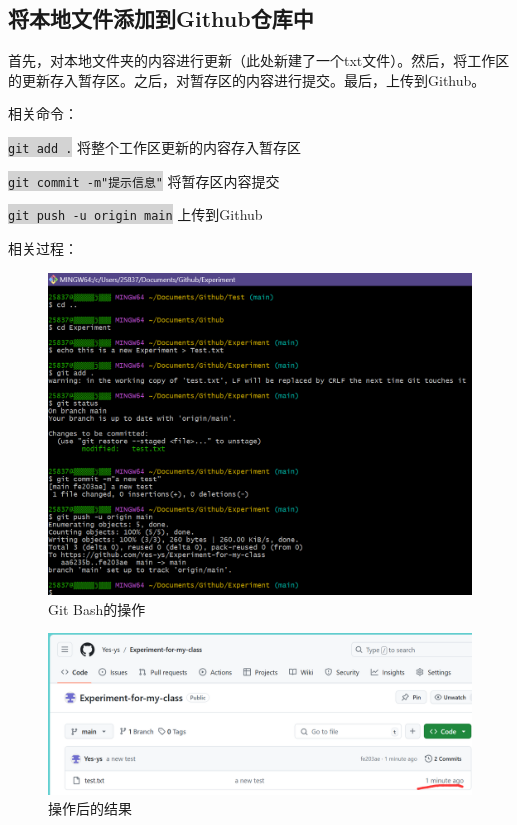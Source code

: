 \documentclass[a4paper, 12pt]{article}
\begin{document}
\clearpage

  \subsection{将本地文件添加到Github仓库中}

首先，对本地文件夹的内容进行更新（此处新建了一个txt文件）。然后，将工作区的更新存入暂存区。之后，对暂存区的内容进行提交。最后，上传到Github。

相关命令：

\colorbox{lightgray}{\texttt{git add .}} 将整个工作区更新的内容存入暂存区

\colorbox{lightgray}{\texttt{git commit -m"提示信息"}} 将暂存区内容提交

\colorbox{lightgray}{\texttt{git push -u origin main}} 上传到Github

相关过程：

\begin{figure}[h]
  \centering
  \includegraphics[scale=0.4]{im6}
  \caption{Git Bash的操作}
  \label{image-myimage}
\end{figure}

\begin{figure}[h]
  \centering
  \includegraphics[scale=0.3]{im7}
  \caption{操作后的结果}
  \label{image-myimage}
\end{figure}
\end{document}

